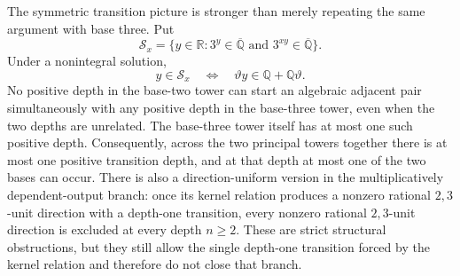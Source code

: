 \documentclass[11pt,oneside]{article}
\theoremstyle{definition}
\theoremstyle{remark}
\newcommand{\Q}{\mathbb Q}
\newcommand{\R}{\mathbb R}
\newcommand{\Abar}{\overline{\mathbb Q}}
\newcommand{\thetaq}{\vartheta}
\newcommand{\Qbar}{\Abar}
\begin{document}
The symmetric transition picture is stronger than merely repeating the same argument with
base three.  Put
\[
 \mathcal S_x=\{y\in\R:3^y\in\Qbar\text{ and }3^{xy}\in\Qbar\}.
\]
Under a nonintegral solution,
\begin{equation}
 y\in\mathcal S_x
 \quad\Longleftrightarrow\quad
 \thetaq y\in\Q+\Q\thetaq.
 \label{sp:eq-three-tower-transition}
\end{equation}
No positive depth in the base-two tower can start an algebraic adjacent pair simultaneously
with any positive depth in the base-three tower, even when the two depths are unrelated.
The base-three tower itself has at most one such positive depth.  Consequently, across the
two principal towers together there is at most one positive transition depth, and at that
depth at most one of the two bases can occur.  There is also a direction-uniform version in
the multiplicatively dependent-output branch: once its kernel relation produces a nonzero
rational $2,3$-unit direction with a depth-one transition, every nonzero rational
$2,3$-unit direction is excluded at every depth $n\ge2$.  These are strict structural
obstructions, but they still allow the single depth-one transition forced by the kernel
relation and therefore do not close that branch.
\end{document}

